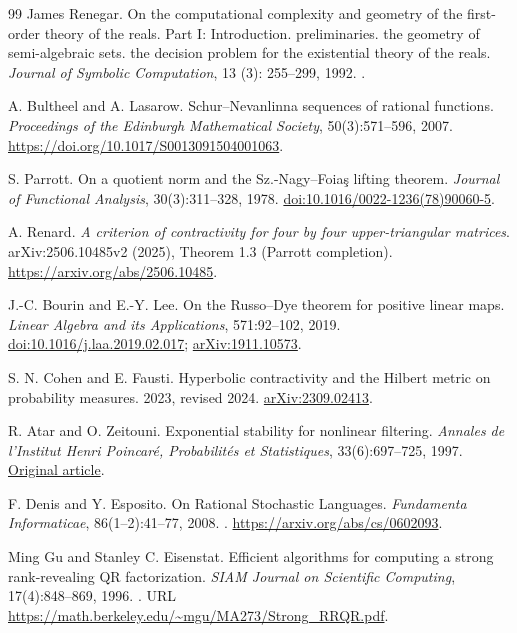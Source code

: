 \begin{thebibliography}{99}
James Renegar.
\newblock On the computational complexity and geometry of the first-order
  theory of the reals. {Part I}: Introduction. preliminaries. the geometry of
  semi-algebraic sets. the decision problem for the existential theory of the
  reals.
\newblock \emph{Journal of Symbolic Computation}, 13 (3):
  255--299, 1992.
\newblock {}.

A. Bultheel and A. Lasarow. Schur--Nevanlinna sequences of rational functions.
\emph{Proceedings of the Edinburgh Mathematical Society}, 50(3):571--596, 2007.
\url{https://doi.org/10.1017/S0013091504001063}.

S. Parrott.
On a quotient norm and the Sz.-Nagy--Foia\c{s} lifting theorem.
\emph{Journal of Functional Analysis}, 30(3):311--328, 1978.
\href{https://doi.org/10.1016/0022-1236(78)90060-5}{doi:10.1016/0022-1236(78)90060-5}.

A. Renard. \emph{A criterion of contractivity for four by four upper-triangular matrices}. arXiv:2506.10485v2 (2025), Theorem 1.3 (Parrott completion). \url{https://arxiv.org/abs/2506.10485}.

J.-C. Bourin and E.-Y. Lee.
\newblock On the Russo--Dye theorem for positive linear maps.
\newblock \emph{Linear Algebra and its Applications}, 571:92--102, 2019.
\newblock \href{https://doi.org/10.1016/j.laa.2019.02.017}{doi:10.1016/j.laa.2019.02.017};
\href{https://arxiv.org/abs/1911.10573}{arXiv:1911.10573}.

S. N. Cohen and E. Fausti.
Hyperbolic contractivity and the Hilbert metric on probability measures.
2023, revised 2024. \href{https://arxiv.org/abs/2309.02413}{arXiv:2309.02413}.

R. Atar and O. Zeitouni.
Exponential stability for nonlinear filtering.
\emph{Annales de l'Institut Henri Poincar\'e, Probabilit\'es et Statistiques}, 33(6):697--725, 1997.
\href{https://www.numdam.org/item/AIHPB_1997__33_6_697_0/}{Original article}.

F. Denis and Y. Esposito.
On Rational Stochastic Languages.
\emph{Fundamenta Informaticae}, 86(1--2):41--77, 2008.
.
\url{https://arxiv.org/abs/cs/0602093}.

Ming Gu and Stanley C. Eisenstat.
\newblock Efficient algorithms for computing a strong rank-revealing QR
factorization.
\newblock \emph{SIAM Journal on Scientific Computing}, 17(4):848--869, 1996.
\newblock {}.
\newblock URL \url{https://math.berkeley.edu/~mgu/MA273/Strong_RRQR.pdf}.


\end{thebibliography}
